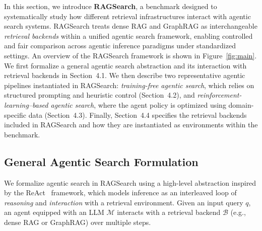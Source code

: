 
In this section, we introduce \textbf{RAGSearch}, a benchmark designed to systematically study how different retrieval infrastructures interact with agentic search systems. RAGSearch treats dense RAG and GraphRAG as interchangeable \emph{retrieval backends} within a unified agentic search framework, enabling controlled and fair comparison across agentic inference paradigms under standardized settings. An overview of the RAGSearch framework is shown in Figure~\ref{fig:main}.
We first formalize a general agentic search abstraction and its interaction with retrieval backends in Section~4.1. We then describe two representative agentic pipelines instantiated in RAGSearch: \emph{training-free agentic search}, which relies on structured prompting and heuristic control (Section~4.2), and \emph{reinforcement-learning–based agentic search}, where the agent policy is optimized using domain-specific data (Section~4.3). Finally, Section~4.4 specifies the retrieval backends included in RAGSearch and how they are instantiated as environments within the benchmark.


\subsection{General Agentic Search Formulation}
\label{sec:agentic_formulation}

We formalize agentic search in RAGSearch using a high-level abstraction inspired by the ReAct~\cite{yao2022react} framework, which models inference as an interleaved loop of \emph{reasoning} and \emph{interaction} with a retrieval environment. Given an input query $q$, an agent equipped with an LLM $\mathcal{M}$ interacts with a retrieval backend $\mathcal{B}$ (e.g., dense RAG or GraphRAG) over multiple steps.

